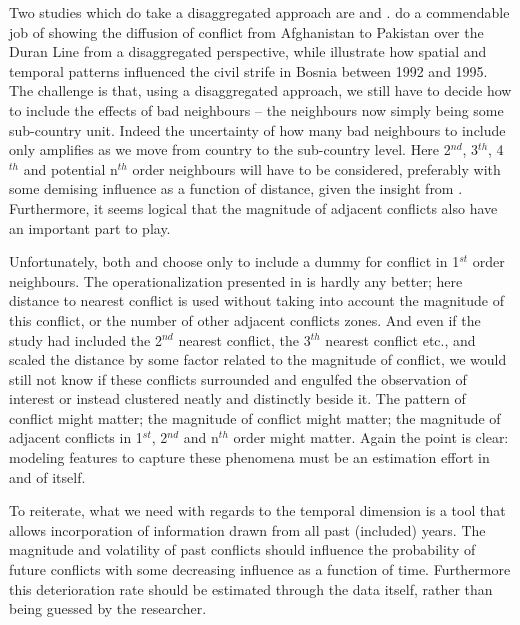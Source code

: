 \documentclass[a4paper]{article}
\begin{document}
Two studies which do take a disaggregated approach are \cite{ol2010afghanistan} and \cite{weidmann_ward_2010predicting}. \cite{ol2010afghanistan} do a commendable job of showing the diffusion of conflict from Afghanistan to Pakistan over the Duran Line from a disaggregated perspective, while \cite{weidmann_ward_2010predicting} illustrate how spatial and temporal patterns influenced the civil strife in Bosnia between 1992 and 1995. The challenge is that, using a disaggregated approach, we still have to decide how to include the effects of bad neighbours -- the neighbours now simply being some sub-country unit. Indeed the uncertainty of how many bad neighbours to include only amplifies as we move from country to the sub-country level. Here 2$^{nd}$, 3$^{th}$, 4$^{th}$ and potential n$^{th}$ order neighbours will have to be considered, preferably with some demising influence as a function of distance, given the insight from \cite{schutte2011diffusion}. Furthermore, it seems logical that the magnitude of adjacent conflicts also have an important part to play.\par

Unfortunately, both \cite{ol2010afghanistan} and \cite{weidmann_ward_2010predicting} choose only to include a dummy for conflict in 1$^{st}$ order neighbours. The operationalization presented in \cite{Maase} is hardly any better; here distance to nearest conflict is used without taking into account the magnitude of this conflict, or the number of other adjacent conflicts zones. And even if the study had included the 2$^{nd}$ nearest conflict, the 3$^{th}$ nearest conflict etc., and scaled the distance by some factor related to the magnitude of conflict, we would still not know if these conflicts surrounded and engulfed the observation of interest or instead clustered neatly and distinctly beside it. The pattern of conflict might matter; the magnitude of conflict might matter; the magnitude of adjacent conflicts in 1$^{st}$, 2$^{nd}$ and n$^{th}$ order might matter. Again the point is clear: modeling features to capture these phenomena must be an estimation effort in and of itself.\par

To reiterate, what we need with regards to the temporal dimension is a tool that allows incorporation of information drawn from all past (included) years. The magnitude and volatility of past conflicts should influence the probability of future conflicts with some decreasing influence as a function of time. Furthermore this deterioration rate should be estimated through the data itself, rather than being guessed by the researcher.\par
\end{document}
